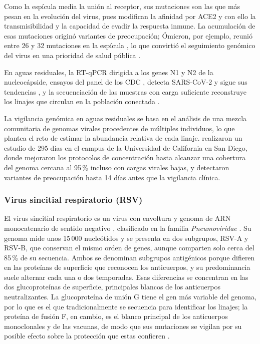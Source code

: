 Como la espícula media la unión al receptor, sus mutaciones son las que más pesan en la evolución del virus, pues modifican la afinidad por ACE2 y con ello la transmisibilidad y la capacidad de evadir la respuesta inmune. La acumulación de esas mutaciones originó variantes de preocupación; Ómicron, por ejemplo, reunió entre 26 y 32 mutaciones en la espícula \cite{Zahmatkesh_2022}, lo que convirtió el seguimiento genómico del virus en una prioridad de salud pública \cite{Karthikeyan_2022,Parkins_2023}.

En aguas residuales, la RT-qPCR dirigida a los genes N1 y N2 de la nucleocápside, ensayos del panel de los CDC \cite{Parkins_2023}, detecta SARS-CoV-2 y sigue sus tendencias \cite{Acosta_2022}, y la secuenciación de las muestras con carga suficiente reconstruye los linajes que circulan en la población conectada \cite{Karthikeyan_2022}.

La vigilancia genómica en aguas residuales se basa en el análisis de una mezcla comunitaria de genomas virales procedentes de múltiples individuos, lo que plantea el reto de estimar la abundancia relativa de cada linaje.  realizaron un estudio de 295 días en el campus de la Universidad de California en San Diego, donde mejoraron los protocolos de concentración hasta alcanzar una cobertura del genoma cercana al 95\,\% incluso con cargas virales bajas, y detectaron variantes de preocupación hasta 14 días antes que la vigilancia clínica.

\subsubsection{Virus sincitial respiratorio (RSV)}

El virus sincitial respiratorio es un virus con envoltura y genoma de ARN monocatenario de sentido negativo \cite{Murray_2021}, clasificado en la familia \textit{Pneumoviridae} \cite{RoldanHernandez_2023}. Su genoma mide unos 15\,000 nucleótidos y se presenta en dos subgrupos, RSV-A y RSV-B, que conservan el mismo orden de genes, aunque comparten solo cerca del 85\,\% de su secuencia. Ambos se denominan subgrupos antigénicos porque difieren en las proteínas de superficie que reconocen los anticuerpos, y su predominancia suele alternar cada una o dos temporadas. Esas diferencias se concentran en las dos glucoproteínas de superficie, principales blancos de los anticuerpos neutralizantes. La glucoproteína de unión G tiene el gen más variable del genoma, por lo que es el que tradicionalmente se secuencia para identificar los linajes; la proteína de fusión F, en cambio, es el blanco principal de los anticuerpos monoclonales y de las vacunas, de modo que sus mutaciones se vigilan por su posible efecto sobre la protección que estas confieren \cite{Maloney_2025,deKorne_2025}.

